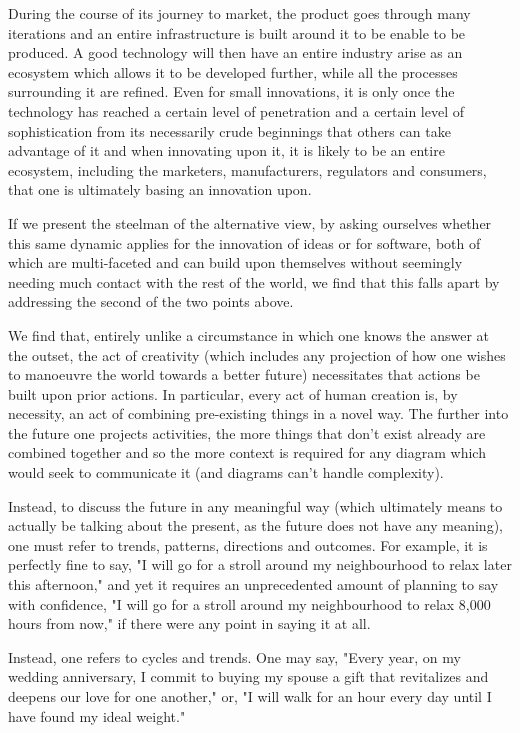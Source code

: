 \documentclass{article}
\begin{document}
\begin{multicols}{2}
During the course of its journey to market, the product goes through many iterations and an entire infrastructure is built around it to be enable to be produced. A good technology will then have an entire industry arise as an ecosystem which allows it to be developed further, while all the processes surrounding it are refined. Even for small innovations, it is only once the technology has reached a certain level of penetration and a certain level of sophistication from its necessarily crude beginnings that others can take advantage of it and when innovating upon it, it is likely to be an entire ecosystem, including the marketers, manufacturers, regulators and consumers, that one is ultimately basing an innovation upon.

If we present the steelman of the alternative view, by asking ourselves whether this same dynamic applies for the innovation of ideas or for software, both of which are multi-faceted and can build upon themselves without seemingly needing much contact with the rest of the world, we find that this falls apart by addressing the second of the two points above.

We find that, entirely unlike a circumstance in which one knows the answer at the outset, the act of creativity (which includes any projection of how one wishes to manoeuvre the world towards a better future) necessitates that actions be built upon prior actions. In particular, every act of human creation is, by necessity, an act of combining pre-existing things in a novel way. The further into the future one projects activities, the more things that don't exist already are combined together and so the more context is required for any diagram which would seek to communicate it (and diagrams can't handle complexity).

Instead, to discuss the future in any meaningful way (which ultimately means to actually be talking about the present, as the future does not have any meaning), one must refer to trends, patterns, directions and outcomes. For example, it is perfectly fine to say, "I will go for a stroll around my neighbourhood to relax later this afternoon," and yet it requires an unprecedented amount of planning to say with confidence, "I will go for a stroll around my neighbourhood to relax 8,000 hours from now," if there were any point in saying it at all.

Instead, one refers to cycles and trends. One may say, "Every year, on my wedding anniversary, I commit to buying my spouse a gift that revitalizes and deepens our love for one another," or, "I will walk for an hour every day until I have found my ideal weight."


\end{multicols}
\end{document}
